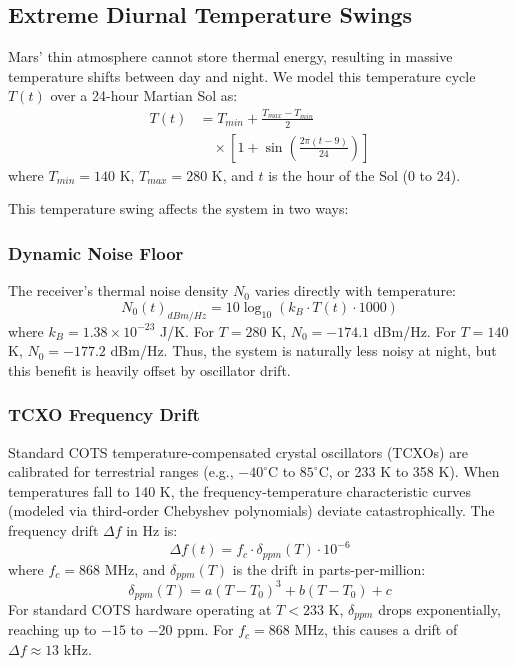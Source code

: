 \documentclass[journal,10pt,doublecolumn]{IEEEtran}
\begin{document}
\subsection{Extreme Diurnal Temperature Swings}
Mars' thin atmosphere cannot store thermal energy, resulting in massive temperature shifts between day and night. We model this temperature cycle $T(t)$ over a 24-hour Martian Sol as:
\begin{equation}
\begin{split}
    T(t) &= T_{min} + \frac{T_{max} - T_{min}}{2} \\
    &\quad \times \left[1 + \sin\left(\frac{2\pi(t - 9)}{24}\right)\right]
\end{split}
\end{equation}
where $T_{min} = 140$ K, $T_{max} = 280$ K, and $t$ is the hour of the Sol (0 to 24).

This temperature swing affects the system in two ways:
\subsubsection{Dynamic Noise Floor}
The receiver's thermal noise density $N_0$ varies directly with temperature:
\begin{equation}
    N_0(t)_{dBm/Hz} = 10\log_{10}\left(k_B \cdot T(t) \cdot 1000\right)
\end{equation}
where $k_B = 1.38 \times 10^{-23}$ J/K. 
For $T = 280$ K, $N_0 = -174.1$ dBm/Hz. For $T = 140$ K, $N_0 = -177.2$ dBm/Hz. Thus, the system is naturally less noisy at night, but this benefit is heavily offset by oscillator drift.

\subsubsection{TCXO Frequency Drift}
Standard COTS temperature-compensated crystal oscillators (TCXOs) are calibrated for terrestrial ranges (e.g., $-40^\circ$C to $85^\circ$C, or 233 K to 358 K). When temperatures fall to 140 K, the frequency-temperature characteristic curves (modeled via third-order Chebyshev polynomials) deviate catastrophically. The frequency drift $\Delta f$ in Hz is:
\begin{equation}
    \Delta f(t) = f_c \cdot \delta_{ppm}(T) \cdot 10^{-6}
\end{equation}
where $f_c = 868$ MHz, and $\delta_{ppm}(T)$ is the drift in parts-per-million:
\begin{equation}
    \delta_{ppm}(T) = a(T-T_0)^3 + b(T-T_0) + c
\end{equation}
For standard COTS hardware operating at $T < 233$ K, $\delta_{ppm}$ drops exponentially, reaching up to $-15$ to $-20$ ppm. For $f_c = 868$ MHz, this causes a drift of $\Delta f \approx 13$ kHz. 
\end{document}
